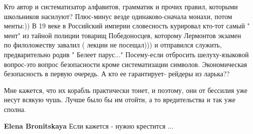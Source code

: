 \begin{itemize}

Кто автор и систематизатор алфавитов, грамматик и прочих правил, которыми
школьников насилуют? Плюс-минус везде одинаково-сначала монахи, потом менты:))
В 19 веке в Российский империи словесность курировал кто-тот самый " мент" из
тайной полиции товарищ Победоносцев, которому Лермонтов экзамен по филоложеству
завалил ( лекции не посещал))) и отправился служить, предварительно родив "
Белеет парус..." Посему-если отбросить шелуху-языковой вопрос-это вопрос
безопасности кроме систематизации символов. Экономическая безопасность в первую
очередь. А кто ее гарантирует- рейдеры из ларька??



Мне кажется, что их корабль практически тонет, и поэтому, они от бессилия уже
несут всякую чушь.  Лучше было бы им отойти, а то вредительства и так уже
сполна.

\textbf{Elena Bronitskaya} Если кажется - нужно крестится ...

\end{itemize} %
